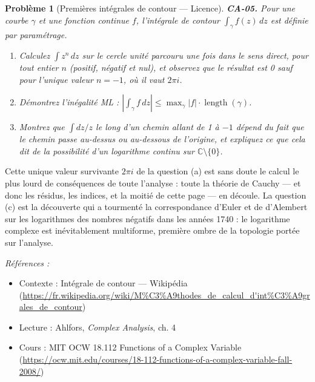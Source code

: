 \documentclass[11pt]{article}
\newtheorem{problem}{Problème}
\newenvironment{refs}{\par\small\noindent\emph{Références :}\begin{itemize}\setlength\itemsep{0pt}}{\end{itemize}\normalsize}
\begin{document}
\bigskip

\begin{problem}[{Premières intégrales de contour --- Licence}]
\textbf{CA-05.} Pour une courbe $ \gamma $ et une fonction continue $ f $, l'intégrale
de contour $ \int_\gamma f(z)\,dz $ est définie par paramétrage.
\begin{enumerate}
\item[(a)] Calculez $ \int z^n\,dz $ sur le cercle unité parcouru une fois dans le sens direct, pour tout
entier $ n $ (positif, négatif et nul), et observez que le résultat est 0 sauf pour l'unique
valeur $ n = -1 $, où il vaut $ 2\pi i $.
\item[(b)] Démontrez l'inégalité ML :
$ \left| \int_\gamma f\,dz \right| \le \max_\gamma |f| \cdot \operatorname{length}(\gamma) $.
\item[(c)] Montrez que $ \int dz/z $ le long d'un chemin allant de 1 à $ -1 $ dépend du fait que le
chemin passe au-dessus ou au-dessous de l'origine, et expliquez ce que cela dit de la possibilité
d'un logarithme continu sur $ \mathbb{C} \setminus \{0\} $.
\end{enumerate}

\end{problem}

\noindent Cette unique valeur survivante $ 2\pi i $ de la question (a) est sans doute le
calcul le plus lourd de conséquences de toute l'analyse : toute la théorie de Cauchy --- et donc les
résidus, les indices, et la moitié de cette page --- en découle. La question (c) est la découverte qui
a tourmenté la correspondance d'Euler et de d'Alembert sur les logarithmes des nombres négatifs dans
les années 1740 : le logarithme complexe est inévitablement multiforme, première ombre de la
topologie portée sur l'analyse.

\begin{refs}
\item Contexte : Intégrale de contour --- Wikipédia (\url{https://fr.wikipedia.org/wiki/M%C3%A9thodes_de_calcul_d'int%C3%A9grales_de_contour})
\item Lecture : Ahlfors, \textit{Complex Analysis}, ch. 4
\item Cours : MIT OCW 18.112 Functions of a Complex Variable (\url{https://ocw.mit.edu/courses/18-112-functions-of-a-complex-variable-fall-2008/})
\end{refs}

\bigskip
\end{document}
